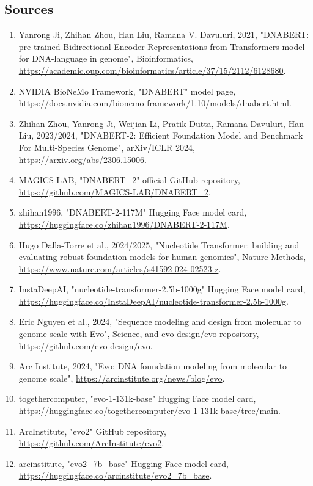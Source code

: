 \documentclass[11pt]{report}
\begin{document}
\subsection{Sources}
\begin{enumerate}
\item Yanrong Ji, Zhihan Zhou, Han Liu, Ramana V. Davuluri, 2021, "DNABERT: pre-trained Bidirectional Encoder Representations from Transformers model for DNA-language in genome", Bioinformatics, \url{https://academic.oup.com/bioinformatics/article/37/15/2112/6128680}.
\item NVIDIA BioNeMo Framework, "DNABERT" model page, \url{https://docs.nvidia.com/bionemo-framework/1.10/models/dnabert.html}.
\item Zhihan Zhou, Yanrong Ji, Weijian Li, Pratik Dutta, Ramana Davuluri, Han Liu, 2023/2024, "DNABERT-2: Efficient Foundation Model and Benchmark For Multi-Species Genome", arXiv/ICLR 2024, \url{https://arxiv.org/abs/2306.15006}.
\item MAGICS-LAB, "DNABERT\_2" official GitHub repository, \url{https://github.com/MAGICS-LAB/DNABERT_2}.
\item zhihan1996, "DNABERT-2-117M" Hugging Face model card, \url{https://huggingface.co/zhihan1996/DNABERT-2-117M}.
\item Hugo Dalla-Torre et al., 2024/2025, "Nucleotide Transformer: building and evaluating robust foundation models for human genomics", Nature Methods, \url{https://www.nature.com/articles/s41592-024-02523-z}.
\item InstaDeepAI, "nucleotide-transformer-2.5b-1000g" Hugging Face model card, \url{https://huggingface.co/InstaDeepAI/nucleotide-transformer-2.5b-1000g}.
\item Eric Nguyen et al., 2024, "Sequence modeling and design from molecular to genome scale with Evo", Science, and evo-design/evo repository, \url{https://github.com/evo-design/evo}.
\item Arc Institute, 2024, "Evo: DNA foundation modeling from molecular to genome scale", \url{https://arcinstitute.org/news/blog/evo}.
\item togethercomputer, "evo-1-131k-base" Hugging Face model card, \url{https://huggingface.co/togethercomputer/evo-1-131k-base/tree/main}.
\item ArcInstitute, "evo2" GitHub repository, \url{https://github.com/ArcInstitute/evo2}.
\item arcinstitute, "evo2\_7b\_base" Hugging Face model card, \url{https://huggingface.co/arcinstitute/evo2_7b_base}.

\end{enumerate}
\end{document}
